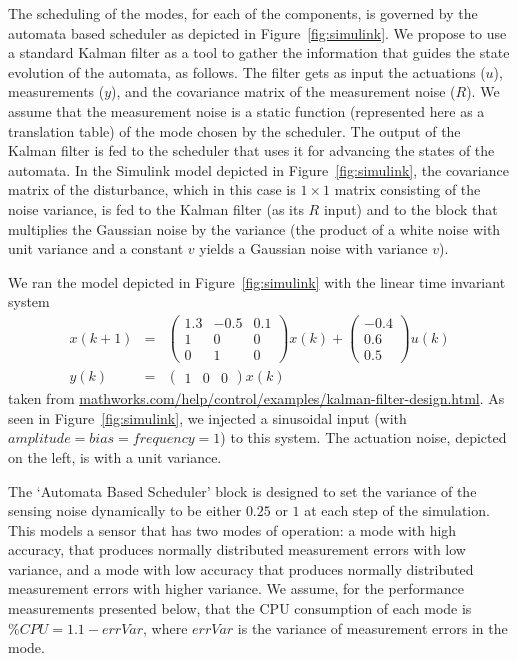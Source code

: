 \documentclass[ twoside, 12pt ]{article}
\begin{document}
The scheduling of the modes, for each of the components, is governed by the automata based scheduler as depicted in Figure~\ref{fig:simulink}. We propose to use a standard Kalman filter as a tool to gather the information that guides the state evolution of the automata, as follows. The filter gets as input the actuations ($u$),  measurements ($y$), and the covariance matrix of the measurement noise ($R$). We assume that the measurement noise is a static function (represented here as a translation table) of the mode chosen by the scheduler. The output of the Kalman filter is fed to the scheduler that uses it for advancing the states of the automata. 
In the Simulink model depicted in Figure~\ref{fig:simulink}, the covariance matrix of the disturbance, which in this case is $1 \times 1$ matrix consisting of the noise variance, is fed to the Kalman filter (as its $R$ input) and to the block that multiplies the Gaussian noise by the variance (the product of a white noise with unit variance and a constant $v$ yields a Gaussian noise with variance $v$).

We ran the model depicted in Figure~\ref{fig:simulink} with the linear time invariant system
\begin{eqnarray*}
    x(k+1) &=& \begin{pmatrix}        1.3  & -0.5  & 0.1 \\
        1    & 0     & 0 \\
        0    & 1     & 0
    \end{pmatrix}x(k)+ 
    \begin{pmatrix}
        -0.4 \\
        0.6\\
        0.5\end{pmatrix} u(k) \\
    y(k)&=& \begin{pmatrix}1 & 0 &0\end{pmatrix}x(k)
\end{eqnarray*}
taken from \url{mathworks.com/help/control/examples/kalman-filter-design.html}. As seen in Figure~\ref{fig:simulink}, we injected a sinusoidal input (with $amplitude=bias=frequency=1$) to this system. 
The actuation noise, depicted on the left, is with a unit variance. 

The `Automata Based Scheduler' block is designed to set the variance of the sensing noise dynamically to be either $0.25$ or $1$ at each step of the simulation. This models a sensor that has two modes of operation: a mode with high accuracy, that produces normally distributed measurement errors with low variance, and a mode with low accuracy that produces normally distributed measurement errors with higher variance. We assume, for the performance measurements presented below, that the CPU consumption of each mode is $\%CPU=1.1-errVar$, where $errVar$ is the variance of measurement errors in the mode.
\end{document}
